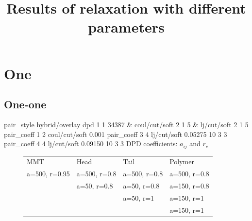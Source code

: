\documentclass[a4paper]{article}
\begin{document}
\title{Results of relaxation with different parameters}
\maketitle


\section*{One}

\subsection*{One-one}
pair\_style hybrid/overlay dpd 1 1 34387 \& coul/cut/soft 2 1 5 \& 
lj/cut/soft 2 1 5\newline
pair\_coeff 1 2 coul/cut/soft 0.001\newline
pair\_coeff 3 4 lj/cut/soft 0.05275 10 3 3\newline
pair\_coeff 4 4 lj/cut/soft 0.09150 10 3 3\newline
DPD coefficients: $a_{ij}$ and $r_c$
\begin{figure}[H]\begin{tabular}{llll}
MMT           & Head         & Tail         & Polymer      \\
a=500, r=0.95 & a=500, r=0.8 & a=500, r=0.8 & a=500, r=0.8 \\
              & a=50,  r=0.8 & a=50,  r=0.8 & a=150, r=0.8 \\
              &              & a=50,  r=1   & a=150, r=1   \\
              &              &              & a=150, r=1   \\
\end{tabular}\end{figure}
\end{document}
